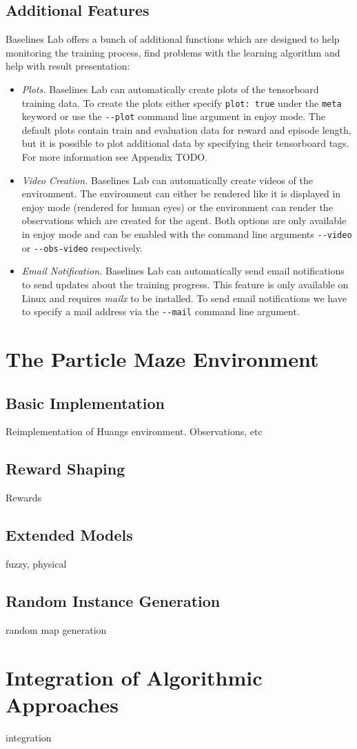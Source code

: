 \subsection{Additional Features} \label{sec:blAdvanced}
Baselines Lab offers a bunch of additional functions which are designed to help monitoring the training process, find problems with the learning algorithm and help with result presentation:

\begin{itemize}
    \item \textit{Plots.} Baselines Lab can automatically create plots of the tensorboard training data. To create the plots either specify \texttt{plot: true} under the \texttt{meta} keyword or use the \texttt{-{}-plot} command line argument in enjoy mode. The default plots contain train and evaluation data for reward and episode length, but it is possible to plot additional data by specifying their tensorboard tags. For more information see Appendix TODO.
    \item \textit{Video Creation.} Baselines Lab can automatically create videos of  the environment. The environment can either be rendered like it is displayed in enjoy mode (rendered for human eyes) or the environment can render the observations which are created for the agent. Both options are only available in enjoy mode and can be enabled with the command line arguments \texttt{-{}-video} or \texttt{-{}-obs-video} respectively.
    \item \textit{Email Notification.} Baselines Lab can automatically send email notifications to send updates about the training progress. This feature is only available on Linux and requires \textit{mailx} to be installed. To send email notifications we have to specify a mail address via the \texttt{-{}-mail} command line argument. 
\end{itemize}

\section{The Particle Maze Environment} \label{sec:MazeEnvironment}

\subsection{Basic Implementation} \label{sec:MazeImplementation}
Reimplementation of Huangs environment. Observations, etc

\subsection{Reward Shaping} \label{sec:MazeReward}
Rewards

\subsection{Extended Models} \label{sec:ExtendedMaze}
fuzzy, physical 

\subsection{Random Instance Generation} \label{sec:RandomInstanceGeneration}
random map generation

\section{Integration of Algorithmic Approaches} \label{sec:AlgorithmIntegration}
integration


